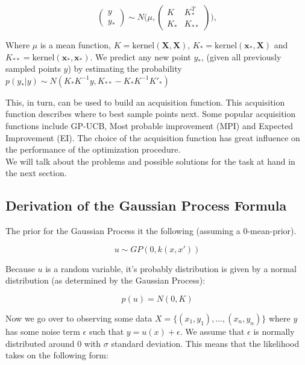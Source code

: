 \documentclass[a4paper,12pt,twoside,openright]{report}
\begin{document}
\begin{equation}
\begin{pmatrix} y \\
y_* \end{pmatrix} \sim N\Biggl(\mu,\begin{pmatrix} K & K^T_*\\
 K_* & K_{**} \end{pmatrix}\Biggr),
\end{equation}

Where $\mu$ is a mean function, $K = \text{kernel}(\mathbf{X}, \mathbf{X})$, $K_* = \text{kernel}(\mathbf{x_*}, \mathbf{X})$ and $K_{**} = \text{kernel}(\mathbf{x_*}, \mathbf{x_*})$.
We predict any new point $y_*$, (given all previously sampled points $y$) by estimating the probability $ p(y_*|y) \sim N(K_*K^{-1}y,K_{**}-K_*K^{-1}K'_*) $

This, in turn, can be used to build an acquisition function. 
This acquisition function describes where to best sample points next.
Some popular acquisition functions include GP-UCB, Most probable improvement (MPI) and Expected Improvement (EI).
The choice of the acquisition function has great influence on the performance of the optimization procedure.\\

We will talk about the problems and possible solutions for the task at hand in the next section.

\subsection{Derivation of the Gaussian Process Formula}
The prior for the Gaussian Process it the following (assuming a 0-mean-prior).

\begin{equation}
u \sim GP(0, k(x, x'))
\end{equation}

Because $u$ is a random variable, it's probably distribution is given by a normal distribution (as determined by the Gaussian Process):

\begin{equation}
p(u) = N ( 0, K )
\end{equation}

Now we go over to observing some data $ X = \{ (x_1, y_1), \ldots, (x_n, y_n) \} $ where $y$ has some noise term $\epsilon$ such that $y = u(x) + \epsilon$.
We assume that $\epsilon$ is normally distributed around $0$ with $\sigma$ standard deviation.
This means that the likelihood takes on the following form:
\end{document}
